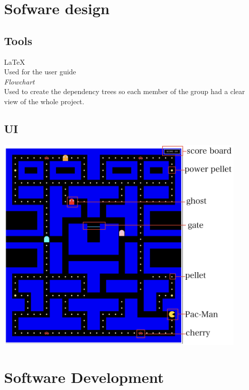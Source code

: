 \documentclass{article}
\begin{document}
 \section{Sofware design}
 \subsection{Tools}
 \hspace{0.5cm}\LaTeX \\
 Used for the user guide\\
 
 \textit{Flowchart}\\
 Used to create the dependency trees so each member of the group had a clear view of the whole project.
 

 \subsection{UI}
\begin{center}
\includegraphics[width=12cm]{./images/user_interface.png}
\end{center}

 \section{Software Development}
\end{document}
